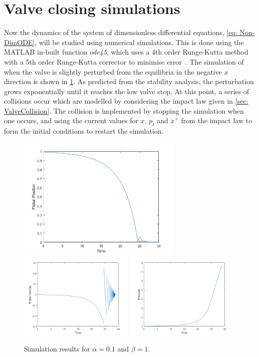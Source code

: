 \section{Valve closing simulations} \label{sec: ClosingSimulation}

Now the dynamics of the system of dimensionless differential equations, \cref{eq: Non-DimODE}, will be studied using numerical simulations. This is done using the MATLAB in-built function \textit{ode45}, which uses a 4th order Runge-Kutta method with a 5th order Runge-Kutta corrector to minimise error~\cite{Shampine1997TheSuite}. The simulation of when the valve is slightly perturbed from the equilibria in the negative $x$ direction is shown in \cref{fig:TimeTrajec}. As predicted from the stability analysis, the perturbation grows exponentially until it reaches the low valve stop. At this point, a series of collisions occur which are modelled by considering the impact law given in \cref{sec: ValveCollision}. The collision is implemented by stopping the simulation when one occurs, and using the current values for $x$, $p_t$ and $\dot{x}^+$ from the impact law to form the initial conditions to restart the simulation.
~
\begin{figure}[!ht]
    \centering
    \includegraphics[width=0.7\textwidth]{Figures/Example/PositionTimeTrajectory.png}
    \includegraphics[width=0.49\textwidth]{Figures/Example/VelocityTimeTrajectory.png}
    \includegraphics[width=0.49\textwidth]{Figures/Example/PressureTimeTrajectory.png}
    \caption{Simulation results for $\alpha = 0.1$ and $\beta = 1$.}
    \label{fig:TimeTrajec}
\end{figure}

